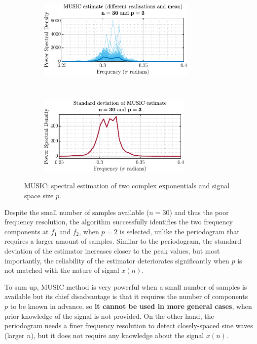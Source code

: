 \begin{enumerate}[label=\alph*), leftmargin=*]
\begin{figure}[h]
\begin{subfigure}{0.49\textwidth}
    \end{subfigure}
    ~
    ~
    \begin{subfigure}{0.49\textwidth}
        \centering
        \includegraphics[height=1.5in]{report/parametric-and-line-spectra/correlation-estimation/assets/e/MUSIC_mean-p_3}
    \end{subfigure}
    ~
    \begin{subfigure}{0.49\textwidth}
        \centering
        \includegraphics[height=1.5in]{report/parametric-and-line-spectra/correlation-estimation/assets/e/MUSIC_std-p_3}
    \end{subfigure}
    \caption{MUSIC: spectral estimation of two complex exponentials and signal space size $p$.}
    \label{fig:2_1_e}
\end{figure}

Despite the small number of samples available ($n = 30$) and thus the poor frequency resolution, the algorithm successfully identifies the two
frequency components at $f_{1}$ and $f_{2}$, when $p=2$ is selected, unlike the periodogram that requires a larger amount of samples.
Similar to the periodogram, the standard deviation of the estimator increases closer to the peak values, but most importantly, the reliability
of the estimator deteriorates significantly when $p$ is not matched with the nature of signal $x(n)$.

To sum up, MUSIC method is very powerful when a small number of samples is available but its chief disadvantage is that it requires the number of components $p$ to be known in advance,
so \textbf{it cannot be used in more general cases}, when prior knowledge of the signal is not provided. On the other hand, the periodogram needs
a finer frequency resolution to detect closely-spaced sine waves (larger $n$), but it does not require any knowledge about the signal $x(n)$.

%
\end{enumerate}